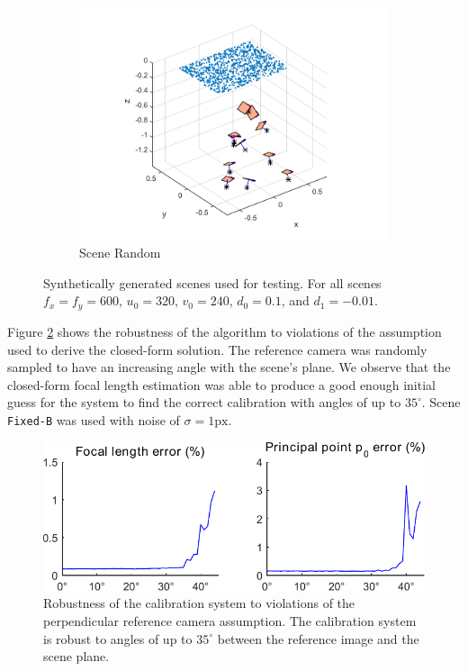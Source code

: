 \documentclass[10pt,twocolumn,letterpaper]{article}
\begin{document}
\begin{figure}
\begin{subfigure}[b]{0.32\linewidth}
\includegraphics[width=\linewidth]{images/synthCameraPosesRandom.pdf}
	\caption{Scene Random}
\end{subfigure}
\caption{Synthetically generated scenes used for testing. For all scenes $f_x=f_y=600$, $u_0=320$, $v_0=240$, $d_0=0.1$, and $d_1=-0.01$.}
\label{fig:synth_poses}
\end{figure}

Figure \ref{fig:results_normal_angle} shows the robustness of the algorithm to violations of the assumption used to derive the closed-form solution. The reference camera was randomly sampled to have an increasing angle with the scene's plane. We observe that the closed-form focal length estimation was able to produce a good enough initial guess for the system to find the correct calibration with angles of up to $35^\circ$.  Scene \texttt{Fixed-B} was used with noise of $\sigma=1\text{px}$.

\begin{figure}
\centering
\includegraphics[width=\linewidth]{images/resultsNormalAngle.pdf}
\caption{Robustness of the calibration system to violations of the perpendicular reference camera assumption. The calibration system is robust to angles of up to $35^\circ$ between the reference image and the scene plane.}
\label{fig:results_normal_angle}
\end{figure}
\end{document}
